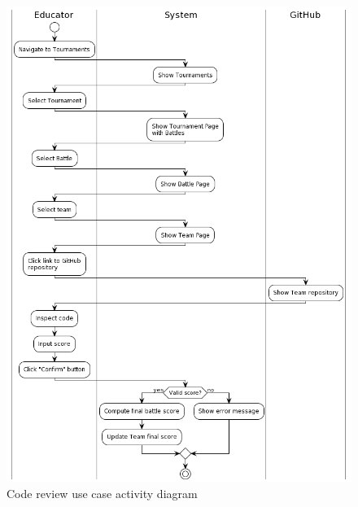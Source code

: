 \begin{center}
\begin{figure}[H]
        \includegraphics[scale=0.5]{Diagrams/activity_reviewcode.png}
        \caption{Code review use case activity diagram}
    \end{figure}
\end{center}

